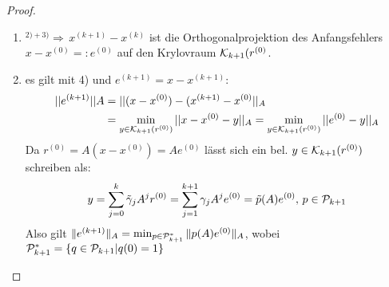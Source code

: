\begin{proof}
\begin{enumerate}[1)]
\begin{proof}
        \begin{align*}
          ^{(\ast \ast \ast)}\Rightarrow& p^{(k+1)}=r^{(k+1)}-\beta^{(k)}p^{(k)} \in \Kc_{k+2}(r^{(0)}) \\
          \Rightarrow & span \{ p^{(0)},\dots p^{(k+1)} \} \subset \Kc_{k+2}(r^{(0)})
        \end{align*}
        $'\supset '$\\
        IV $span \{p^{(0)},\dots p^{(k)}\} = \Kc_{k+1}(r^{(0)})$ \\
        IS: IV $\Rightarrow A^kr^{(0)} \in span \{ p^{(0)},\dots p^{(k)} \}$ \\
        \begin{align*}
          ^{(\ast \ast)} \Rightarrow & A^{k+1}r^{(0)} \in span \{ r^{(0)},\dots , r^{(k+1)} \} = span \{ p^{(0)},\dots p^{(k+1)} \} \\
          \Rightarrow & '\supset '
        \end{align*}
      \end{proof}

    \item $^{2) + 3)} \Rightarrow \, x^{(k+1)}-x^{(k)}$ ist die Orthogonalprojektion des Anfangsfehlers $ x-x^{(0)} =: e^{(0)}$ auf den Krylovraum $\mathcal{K}_{k+1}(r^{(0)}$.\\

    \item es gilt mit 4) und $e^{(k+1)}=x-x^{(k+1)}$:
        \begin{align*}
          ||e^{(k+1)}||A &= || (x-x^{(0)})-(x^{(k+1)} -x^{(0)} ||_A \\
          &= \min_{y \in \mathcal{K}_{k+1}(r^{(0)})} ||x-x^{(0)} - y ||_A = \min_{y \in \mathcal{K}_{k+1}(r^{(0)})} ||e^{(0)} - y ||_A 
        \end{align*}
        Da $r^{(0)} =A(x-x^{(0)})=Ae^{(0)}$  lässt sich ein bel. $y \in \mathcal{K}_{k+1}(r^{(0)})$ schreiben als:
        \[ y= \sum_{j=0}^k \tilde \gamma_j A^jr^{(0)} = \sum_{j=1}^{k+1}\gamma_j A^j e^{(0)} = \tilde p (A)e^{(0)}, \,  p \in \mathcal{P}_{k+1} \]
        Also gilt $\|e^{(k+1)}\|_A = \min_{p\in \mathcal{P}^*_{k+1}} \|p(A)e^{(0)}\|_A$, wobei $\mathcal{P}^*_{k+1}=\left\{ q\in \mathcal{P}_{k+1} | q(0)=1 \right\}$


\end{enumerate}
\end{proof}
